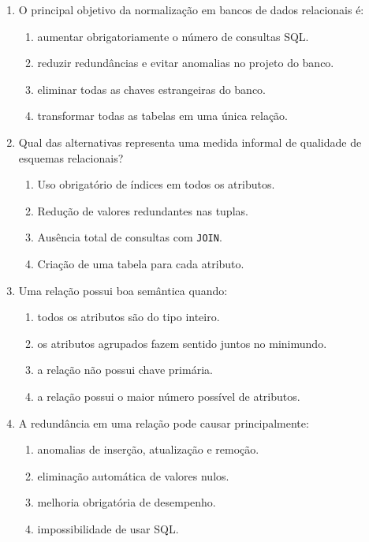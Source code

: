 \documentclass[12pt,a4paper]{article}
\begin{document}
\begin{enumerate}[label=\textbf{Q\arabic*.}]

\item O principal objetivo da normalização em bancos de dados relacionais é:

\begin{enumerate}[label=\alph*)]
    \item aumentar obrigatoriamente o número de consultas SQL.
    \item reduzir redundâncias e evitar anomalias no projeto do banco.
    \item eliminar todas as chaves estrangeiras do banco.
    \item transformar todas as tabelas em uma única relação.
\end{enumerate}

\item Qual das alternativas representa uma medida informal de qualidade de esquemas relacionais?

\begin{enumerate}[label=\alph*)]
    \item Uso obrigatório de índices em todos os atributos.
    \item Redução de valores redundantes nas tuplas.
    \item Ausência total de consultas com \texttt{JOIN}.
    \item Criação de uma tabela para cada atributo.
\end{enumerate}

\item Uma relação possui boa semântica quando:

\begin{enumerate}[label=\alph*)]
    \item todos os atributos são do tipo inteiro.
    \item os atributos agrupados fazem sentido juntos no minimundo.
    \item a relação não possui chave primária.
    \item a relação possui o maior número possível de atributos.
\end{enumerate}

\item A redundância em uma relação pode causar principalmente:

\begin{enumerate}[label=\alph*)]
    \item anomalias de inserção, atualização e remoção.
    \item eliminação automática de valores nulos.
    \item melhoria obrigatória de desempenho.
    \item impossibilidade de usar SQL.
\end{enumerate}


\end{enumerate}
\end{document}
